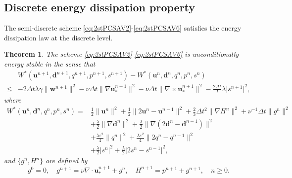 \documentclass[12pt,reqno]{amsart}
\numberwithin{equation}{section}
\newtheorem{theorem}{Theorem}[section]
\newcommand{\uu}{\mathrm{\textbf{u}}}
\newcommand{\dd}{\mathrm{\textbf{d}}}
\newcommand{\ww}{\mathrm{\textbf{w}}}
\begin{document}

\subsection{Discrete energy dissipation property}
The semi-discrete scheme \eqref{eq:2stPCSAV2}-\eqref{eq:2stPCSAV6} satisfies the energy dissipation law at the discrete level. 

\begin{theorem}\label{pcsavthm}
The scheme \eqref{eq:2stPCSAV2}-\eqref{eq:2stPCSAV6} is unconditionally energy stable in the sense that
\begin{equation}\label{2stenergy}
\begin{aligned}
&W^*\left(\uu^{n+1},\dd^{n+1},q^{n+1},p^{n+1},s^{n+1}\right)-W^*\left(\uu^{n},\dd^{n},q^{n},p^{n},s^{n}\right)\\
\leq &-2\Delta t\lambda\gamma\lVert \ww^{n+1}\rVert^2-\nu\Delta t\lVert \nabla\uu_*^{n+1}\rVert^2
-\nu\Delta t \lVert \nabla\times\uu_*^{n+1}\rVert^2
-\frac{2\Delta t}{T}\lambda\lvert s^{n+1}\rvert^2,
\end{aligned}
\end{equation}
where
\begin{align*}
W^*\left(\uu^{n},\dd^{n},q^{n},p^{n},s^{n}\right)=&\frac{1}{2}\lVert\uu^{n}\rVert^2+\frac{1}{2}\lVert2\uu^{n}-\uu^{n-1}\rVert^2+\frac{2}{3}\Delta t^2\lVert\nabla H^{n}\rVert^2
+\nu^{-1}\Delta t\lVert g^{n}\rVert^2\\
&+\frac{\lambda}{2}\lVert\nabla\dd^{n}\rVert^2
+\frac{\lambda}{2}\lVert\nabla\left(2\dd^{n}-\dd^{n-1}\right)\rVert^2\\
&+\frac{\lambda\varepsilon^2}{4}\lVert q^{n}\rVert^2
+\frac{\lambda\varepsilon^2}{4}\lVert 2q^{n}-q^{n-1}\rVert^2\\
&+\frac{\lambda}{2}\lvert s^{n}\rvert^2
+\frac{\lambda}{2}\lvert 2s^{n}-s^{n-1}\rvert^2,
\end{align*}
and $\{g^n,H^n\}$ are defined by
\begin{equation}\label{gh-eq}
g^0=0,\quad g^{n+1}=\nu\nabla\cdot\uu_*^{n+1}+g^n,\quad H^{n+1}=p^{n+1}+g^{n+1},\quad n\ge 0.
\end{equation}
\end{theorem}
\end{document}
